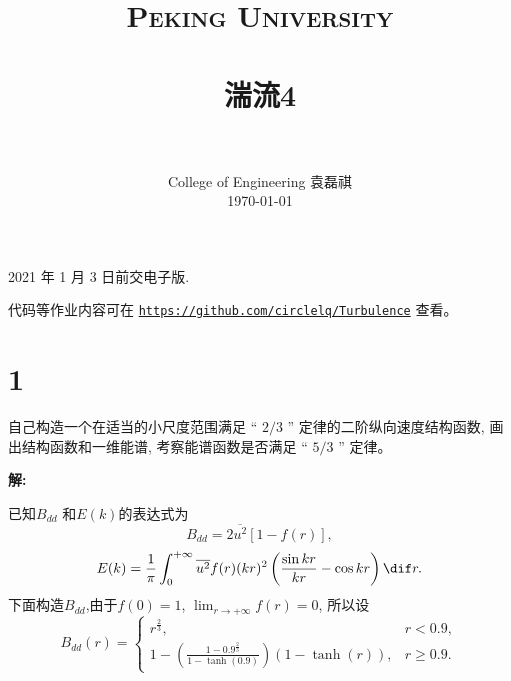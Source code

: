 \documentclass[12pt,a4]{ctexart}
\title{
   \vspace{-1in}
   \usefont{OT1}{bch}{b}{n}
   \normalfont \normalsize \textsc{\LARGE Peking University}\\[1cm] %
   \horrule{0.5pt} \\[0.5cm]
   \huge \bfseries{湍流4} \\
   \horrule{2pt} \\[0.5cm]
}
\author{
   \normalfont									\normalsize
   College of Engineering \quad 2001111690  \quad 袁磊祺\\	\normalsize
   \today
}
\date{}
\begin{document}


\maketitle

2021 年 1 月 3 日前交电子版.

代码等作业内容可在 \texttt{\href{https://github.com/circlelq/Turbulence}{https://github.com/circlelq/Turbulence}} 查看。


\section{1}

自己构造一个在适当的小尺度范围满足 “ $2 / 3$ ” 定律的二阶纵向速度结构函数, 画出结构函数和一维能谱, 考察能谱函数是否满足 “ $5 / 3$ ” 定律。

\textsf{\hspace{-2em}\sf  \textbf{解:}}

已知$B_{d d}$ 和$E(k)$的表达式为\cite{shi}
\begin{equation}
   B_{d d} = 2 \overline{u^2} [1 - f(r)],
\end{equation}
\begin{equation}
   E(k) = \frac{1}{\pi} \int_{0}^{+\infty} \overline{u^2}f(r)(kr)^2\left( \frac{\sin kr}{kr} - \cos kr \right) \dif r.
   \label{eq:1-1}
\end{equation}
下面构造$B_{d d}$,由于$f(0)=1$, $\lim_{r \to +\infty} f(r) = 0$, 所以设
\begin{equation}
   B_{d d}(r) = \begin{cases}
      r^{\frac{2}{3}} ,                                                            & r < 0.9,    \\
      1 - \left(\frac{1 - 0.9^{\frac{2}{3}}}{1 - \tanh(0.9)}\right)(1 - \tanh(r)), & r \ge  0.9.
   \end{cases}
\end{equation}
\end{document}
